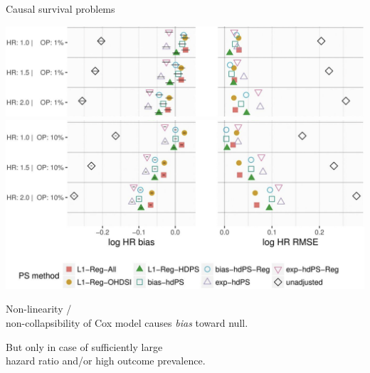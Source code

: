 \documentclass[aspectratio=169,xcolor=dvipsnames]{beamer}					%
\begin{document}
{
\begin{frame}{Causal survival problems}
	\hspace*{.03\linewidth}
	\begin{minipage}{.7\linewidth}
	\includegraphics[width=\linewidth]{figures/positive_control_experiments_1_percent_outcome}
	\includegraphics[width=\linewidth]{figures/positive_control_experiments_10_percent_outcome}
	\end{minipage}
	\nobreak\hspace{.15em}
	\begin{minipage}{.24\linewidth}
	Non-linearity / \\ non-collapsibility of Cox model causes \emph{bias} toward null.
	
	\pause
	\vspace*{\baselineskip}
	But only in case of sufficiently large\\ hazard ratio and/or high outcome prevalence.
	\end{minipage}
\end{frame}
}
\end{document}
